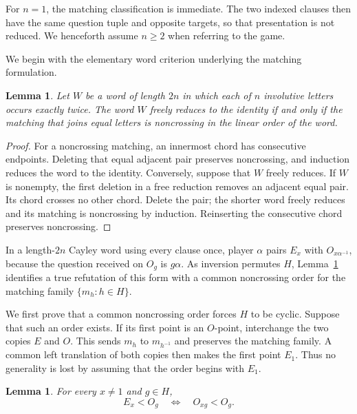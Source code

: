 \documentclass[11pt]{article}
\newtheorem{lemma}[theorem]{Lemma}
\theoremstyle{definition}
\theoremstyle{remark}
\numberwithin{equation}{section}
\begin{document}
For \(n=1\), the matching classification is immediate.  The two indexed
clauses then have the same question tuple and opposite targets, so that
presentation is not reduced.  We henceforth assume \(n\geq2\) when referring
to the game.

We begin with the elementary word criterion underlying the matching
formulation.

\begin{lemma}\label{lem:cayley-chord}
Let \(W\) be a word of length \(2n\) in which each of \(n\) involutive
letters occurs exactly twice.  The word \(W\) freely reduces to the identity
if and only if the matching that joins equal letters is noncrossing in the
linear order of the word.
\end{lemma}

\begin{proof}
For a noncrossing matching, an innermost chord has consecutive endpoints.
Deleting that equal adjacent pair preserves noncrossing, and induction
reduces the word to the identity.  Conversely, suppose that \(W\) freely
reduces.  If \(W\) is nonempty, the first deletion in a free reduction
removes an adjacent equal pair.  Its chord crosses no other chord.  Delete
the pair; the shorter word freely reduces and its matching is noncrossing by
induction.  Reinserting the consecutive chord preserves noncrossing.
\end{proof}

In a length-\(2n\) Cayley word using every clause once, player \(\alpha\)
pairs \(E_x\) with \(O_{x\alpha^{-1}}\), because the question received on
\(O_g\) is \(g\alpha\).  As inversion permutes \(H\),
Lemma~\ref{lem:cayley-chord} identifies a true refutation of this form with a
common noncrossing order for the matching family \(\{m_h:h\in H\}\).

We first prove that a common noncrossing order forces \(H\) to be cyclic.
Suppose that such an order exists.  If its first
point is an \(O\)-point, interchange the two copies \(E\) and \(O\).
This sends \(m_h\) to \(m_{h^{-1}}\) and preserves the matching family.
A common left translation of both copies then makes the first point \(E_1\).
Thus no generality is lost by assuming that the order begins with \(E_1\).

\begin{lemma}\label{lem:cayley-side}
For every \(x\ne1\) and \(g\in H\),
\begin{equation}\label{eq:cayley-side}
  E_x<O_g
  \quad\Longleftrightarrow\quad
  O_{xg}<O_g.
\end{equation}
\end{lemma}
\end{document}
